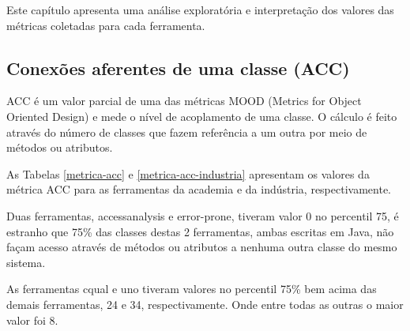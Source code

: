 {Este capítulo apresenta uma análise exploratória e interpretação dos valores das métricas coletadas para cada ferramenta.}
\label{analise-metricas}

\subsection{Conexões aferentes de uma classe (ACC)}

ACC é um valor parcial de uma das métricas MOOD (Metrics for Object Oriented
Design) \cite{Brito1994} e mede o nível de acoplamento de uma classe. O
cálculo é feito através do número de classes que fazem referência a um outra
por meio de métodos ou atributos.

As Tabelas \ref{metrica-acc} e \ref{metrica-acc-industria} apresentam os
valores da métrica ACC para as ferramentas da academia e da indústria,
respectivamente.


Duas ferramentas, accessanalysis e error-prone, tiveram valor 0 no percentil
75, é estranho que 75\% das classes destas 2 ferramentas, ambas escritas em
Java, não façam acesso através de métodos ou atributos a nenhuma outra classe
do mesmo sistema.


As ferramentas cqual e uno tiveram valores no percentil 75\% bem acima das
demais ferramentas, 24 e 34, respectivamente. Onde entre todas as outras o
maior valor foi 8.

